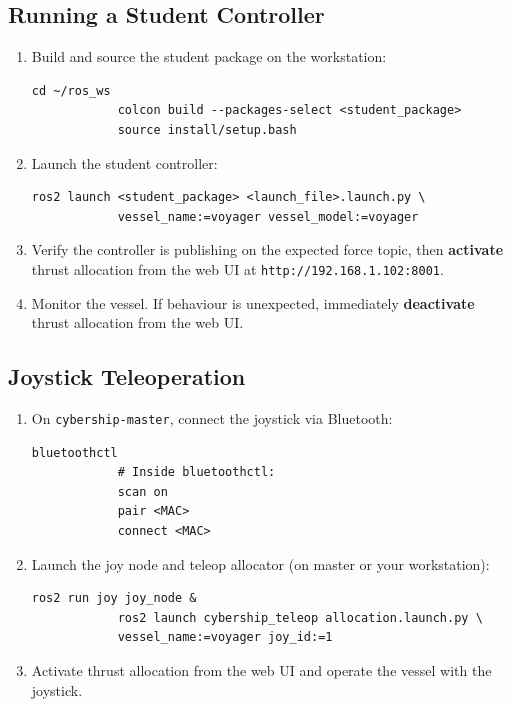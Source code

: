 \documentclass[12pt,a4paper]{article}
\begin{document}
	\subsection{Running a Student Controller}
	\label{ssec:student-controller}
	
	\begin{enumerate}
		\item Build and source the student package on the workstation:
		\begin{lstlisting}[style=bash]
			cd ~/ros_ws
			colcon build --packages-select <student_package>
			source install/setup.bash
		\end{lstlisting}
		\item Launch the student controller:
		\begin{lstlisting}[style=bash]
			ros2 launch <student_package> <launch_file>.launch.py \
			vessel_name:=voyager vessel_model:=voyager
		\end{lstlisting}
		\item Verify the controller is publishing on the expected force topic, then
		\textbf{activate} thrust allocation from the web UI at
		\texttt{http://192.168.1.102:8001}.
		\item Monitor the vessel. If behaviour is unexpected, immediately
		\textbf{deactivate} thrust allocation from the web UI.
	\end{enumerate}
	
	\subsection{Joystick Teleoperation}
	\label{ssec:joystick}
	
	\begin{enumerate}
		\item On \texttt{cybership-master}, connect the joystick via Bluetooth:
		\begin{lstlisting}[style=bash]
			bluetoothctl
			# Inside bluetoothctl:
			scan on
			pair <MAC>
			connect <MAC>
		\end{lstlisting}
		\item Launch the joy node and teleop allocator (on master or your workstation):
		\begin{lstlisting}[style=bash]
			ros2 run joy joy_node &
			ros2 launch cybership_teleop allocation.launch.py \
			vessel_name:=voyager joy_id:=1
		\end{lstlisting}
		\item Activate thrust allocation from the web UI and operate the vessel with the joystick.
	\end{enumerate}
	
\end{document}
